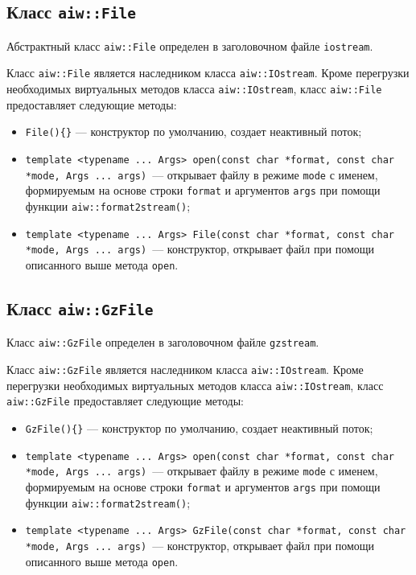 \subsection{Класс {\tt aiw::File}}
Абстрактный класс \verb'aiw::File' определен в заголовочном файле \verb'iostream'.

Класс \verb'aiw::File' является наследником класса \verb'aiw::IOstream'. Кроме перегрузки необходимых
виртуальных методов класса \verb'aiw::IOstream', класс \verb'aiw::File' предоставляет следующие методы:
\begin{itemize}
\item \verb'File(){}' --- конструктор по умолчанию, создает неактивный поток;
\item \verb'template <typename ... Args> open(const char *format, const char *mode, Args ... args)'~---
  открывает файлу в режиме \verb'mode' с именем, формируемым на основе строки \verb'format' и аргументов \verb'args'
  при помощи функции  \verb'aiw::format2stream()';
\item \verb'template <typename ... Args> File(const char *format, const char *mode, Args ... args)'~---
  конструктор, открывает файл при помощи описанного выше метода \verb'open'.
\end{itemize}

\subsection{Класс {\tt aiw::GzFile}}
Класс \verb'aiw::GzFile' определен в заголовочном файле \verb'gzstream'.

Класс \verb'aiw::GzFile' является наследником класса \verb'aiw::IOstream'. Кроме перегрузки необходимых
виртуальных методов класса \verb'aiw::IOstream', класс \verb'aiw::GzFile' предоставляет следующие методы:
\begin{itemize}
\item \verb'GzFile(){}' --- конструктор по умолчанию, создает неактивный поток;
\item \verb'template <typename ... Args> open(const char *format, const char *mode, Args ... args)'~---
  открывает файлу в режиме \verb'mode' с именем, формируемым на основе строки \verb'format' и аргументов \verb'args'
  при помощи функции  \verb'aiw::format2stream()';
\item \verb'template <typename ... Args> GzFile(const char *format, const char *mode, Args ... args)'~---
  конструктор, открывает файл при помощи описанного выше метода \verb'open'.
\end{itemize}

